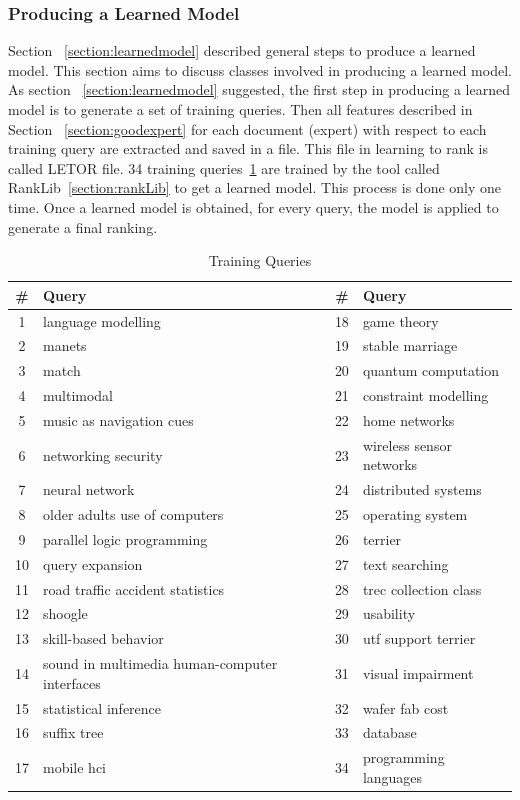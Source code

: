 \subsubsection{Producing a Learned Model}
Section ~\ref{section:learnedmodel} described general steps to produce a learned model. This section aims to discuss classes involved in producing a learned model.
As section ~\ref{section:learnedmodel} suggested, the first step in producing a learned model is to generate a set of training queries. 
Then all features described in Section ~\ref{section:goodexpert} for each document (expert) with respect to each training query are extracted and saved
in a file. This file in learning to rank is called LETOR file.
34 training queries~\ref{table:trainingqueries} are trained by the tool called RankLib~\ref{section:rankLib} to get a learned model. This process is done 
only one time. Once a learned model is obtained, for every query, the model is applied to generate a final ranking.
\begin{table}
\centering
\begin{tabular}{|c|l|c|l|}
\hline \textbf{\#} & \textbf{Query} & \textbf{\#} & \textbf{Query} \\
\hline 1 & language modelling & 18 & game theory\\
\hline 2 & manets & 19 & stable marriage \\
\hline 3  & match & 20 & quantum computation\\ 
\hline 4  & multimodal & 21 & constraint modelling\\ 
\hline 5  & music as navigation cues & 22 & home networks\\ 
\hline 6  & networking security & 23 & wireless sensor networks\\ 
\hline 7  & neural network & 24 & distributed systems\\ 
\hline 8  & older adults use of computers & 25 & operating system\\ 
\hline 9  & parallel logic programming & 26 & terrier\\ 
\hline 10  & query expansion & 27 & text searching\\ 
\hline 11  & road traffic accident statistics & 28 & trec collection class\\ 
\hline 12  & shoogle & 29 & usability\\ 
\hline 13  & skill-based behavior & 30 & utf support terrier\\ 
\hline 14  & sound in multimedia human-computer interfaces & 31 & visual impairment\\ 
\hline 15  & statistical inference & 32 & wafer fab cost \\ 
\hline 16  & suffix tree & 33 & database\\ 
\hline 17  & mobile hci & 34 & programming languages\\ 
\hline
\end{tabular}
\caption{Training Queries} \label{table:trainingqueries}
\end{table}

